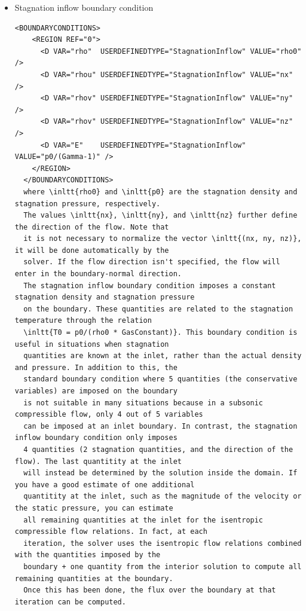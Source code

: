 \begin{itemize}
\item Stagnation inflow boundary condition
\begin{lstlisting}[style=XmlStyle]
  <BOUNDARYCONDITIONS>
    <REGION REF="0">
      <D VAR="rho"  USERDEFINEDTYPE="StagnationInflow" VALUE="rho0" />
      <D VAR="rhou" USERDEFINEDTYPE="StagnationInflow" VALUE="nx" />
      <D VAR="rhov" USERDEFINEDTYPE="StagnationInflow" VALUE="ny" />
      <D VAR="rhov" USERDEFINEDTYPE="StagnationInflow" VALUE="nz" />
      <D VAR="E"    USERDEFINEDTYPE="StagnationInflow" VALUE="p0/(Gamma-1)" />
    </REGION>
  </BOUNDARYCONDITIONS>
  where \inltt{rho0} and \inltt{p0} are the stagnation density and stagnation pressure, respectively.
  The values \inltt{nx}, \inltt{ny}, and \inltt{nz} further define the direction of the flow. Note that 
  it is not necessary to normalize the vector \inltt{(nx, ny, nz)}, it will be done automatically by the 
  solver. If the flow direction isn't specified, the flow will enter in the boundary-normal direction.
  The stagnation inflow boundary condition imposes a constant stagnation density and stagnation pressure 
  on the boundary. These quantities are related to the stagnation temperature through the relation
  \inltt{T0 = p0/(rho0 * GasConstant)}. This boundary condition is useful in situations when stagnation
  quantities are known at the inlet, rather than the actual density and pressure. In addition to this, the
  standard boundary condition where 5 quantities (the conservative variables) are imposed on the boundary
  is not suitable in many situations because in a subsonic compressible flow, only 4 out of 5 variables
  can be imposed at an inlet boundary. In contrast, the stagnation inflow boundary condition only imposes
  4 quantities (2 stagnation quantities, and the direction of the flow). The last quantitity at the inlet
  will instead be determined by the solution inside the domain. If you have a good estimate of one additional 
  quantitity at the inlet, such as the magnitude of the velocity or the static pressure, you can estimate 
  all remaining quantities at the inlet for the isentropic compressible flow relations. In fact, at each 
  iteration, the solver uses the isentropic flow relations combined with the quantities imposed by the
  boundary + one quantity from the interior solution to compute all remaining quantities at the boundary.
  Once this has been done, the flux over the boundary at that iteration can be computed.
  \end{lstlisting}

\end{itemize}

